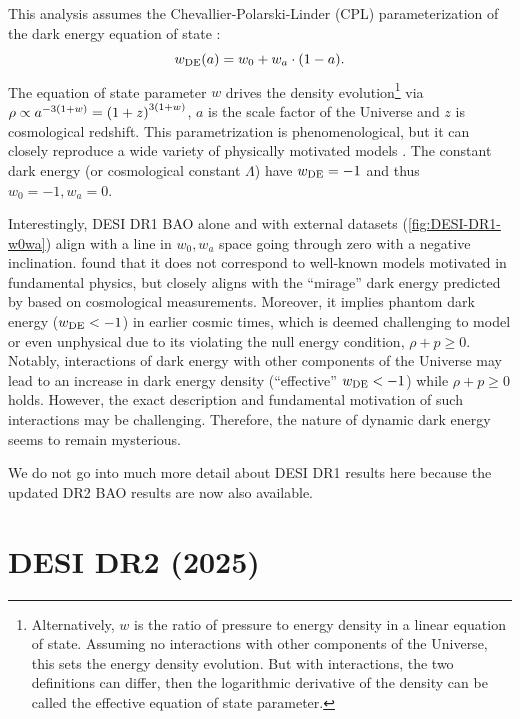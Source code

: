 This analysis assumes the Chevallier-Polarski-Linder (CPL) parameterization of the dark energy equation of state \citep{CPL-Chevalier-Polarski2001,CPL-Linder2003}:
\begin{equation}
    w_{\rm DE} \qty(a) = w_0 + w_a \cdot \qty(1-a).
\end{equation}
The equation of state parameter $w$ drives the density evolution\footnote{Alternatively, $w$ is the ratio of pressure to energy density in a linear equation of state. Assuming no interactions with other components of the Universe, this sets the energy density evolution. But with interactions, the two definitions can differ, then the logarithmic derivative of the density can be called the effective equation of state parameter.} via $\rho \propto a^{-3\qty(1+w)} = \qty(1+z)^{3\qty(1+w)}$, $a$ is the scale factor of the Universe and $z$ is cosmological redshift.
This parametrization is phenomenological, but it can closely reproduce a wide variety of physically motivated models \citep{CPL-Linder2003,CPL-dePutter2008}.
The constant dark energy (or cosmological constant $\Lambda$) have $w_{\rm DE}=-1$ and thus $w_0=-1,w_a=0$.

Interestingly, DESI DR1 BAO alone and with external datasets (\cref{fig:DESI-DR1-w0wa}) align with a line in $w_0,w_a$ space going through zero with a negative inclination.
\cite{DESI2024-physical-DE} found that it does not correspond to well-known models motivated in fundamental physics, but closely aligns with the ``mirage'' dark energy predicted by \cite{mirage-DE} based on cosmological measurements.
Moreover, it implies phantom dark energy ($w_{\rm DE}<-1$) in earlier cosmic times, which is deemed challenging to model \citep[e.g., in][]{interpreting-DESI-DE-Cortes} or even unphysical \citep[e.g., in][]{physical-phantom-DE-after-DESI} due to its violating the null energy condition, $\rho+p\ge 0$.
Notably, interactions of dark energy with other components of the Universe \citep[e.g., dark matter in][]{interacting-DE-after-DESI} may lead to an increase in dark energy density (``effective'' $w_{\rm DE}<-1$) while $\rho+p\ge 0$ holds.
However, the exact description and fundamental motivation of such interactions may be challenging.
Therefore, the nature of dynamic dark energy seems to remain mysterious.

We do not go into much more detail about DESI DR1 results here because the updated DR2 BAO results are now also available.

\section{DESI DR2 (2025)}

